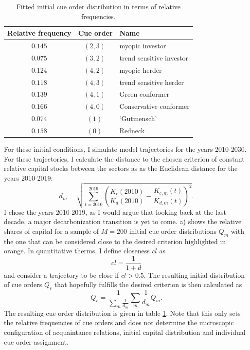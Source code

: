 \begin{table}[t]
    \centering
    \begin{tabular}{c|c|l}
        Relative frequency & Cue order & Name \\ \hline
        $0.145$&$(2, 3)~$&myopic investor\\
    $0.075$& $(3, 2)~$& trend sensitive investor\\
        $0.124$& $(4, 2)~$& myopic herder\\
        $0.118$& $(4, 3)~$& trend sensitive herder\\
        $0.139$& $(4, 1)~$& Green conformer\\
        $0.166$& $(4, 0)~$& Conservative conformer\\
        $0.074$& $(1)~$& `Gutmensch'\\
        $0.158$& $(0)~$& Redneck

    \end{tabular}
    \caption{Fitted initial cue order distribution in terms of relative frequencies.}
    \label{tab:initial_cue_order_dist}
\end{table}

For these initial conditions, I simulate model trajectories for the years 2010-2030. For these trajectories, I calculate the distance to the chosen criterion of constant relative capital stocks between the sectors as as the Euclidean distance for the years 2010-2019:
\begin{equation}
  d_m = \sqrt{\sum_{t=2010}^{2019}\left( \frac{K_c(2010)}{K_d(2010)} - \frac{K_{c,m}(t)}{K_{d,m}(t)} \right)^{2}}.
  \label{eq:distance_criterion}
\end{equation}
I chose the years 2010-2019, as I would argue that looking back at the last decade, a major decarbonization transition is yet to come.
 a) shows the relative shares of capital for a sample of $M=200$ initial cue order distributions $Q_m$ with the one that can be considered close to the desired criterion highlighted in orange. In quantitative therms, I define closeness $cl$ as
\begin{equation}
  cl = \frac{1}{1+d}
  \label{eq:closeness}
\end{equation}
and consider a trajectory to be close if $cl > 0.5$.
The resulting initial distribution of cue orders $Q_r$ that hopefully fulfills the desired criterion is then calculated as
\begin{equation}
    Q_r = \frac{1}{\sum_m \frac{1}{d_m}}\sum_{m}\frac{1}{d_m} Q_m.
  \label{eq:updated_cue_order_distribution}
\end{equation}
The resulting cue order distribution is given in table \ref{tab:initial_cue_order_dist}.
Note that this only sets the relative frequencies of cue orders and does not determine the microscopic configuration of acquaintance relations, initial capital distribution and individual cue order assignment.

